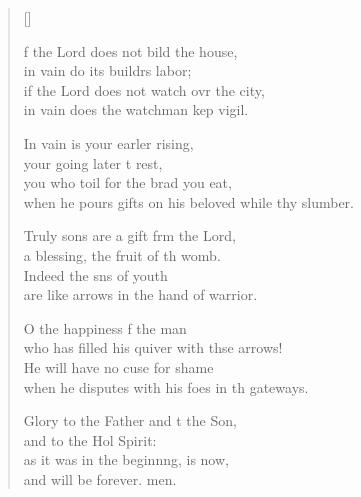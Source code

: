 \settowidth{\versewidth}{when he pours gifts on his beloved while they slumber.}
\begin{verse}[\versewidth]
  \begin{patverse}
f the Lord does not bild the house,\Med\\
in vain do its buildrs labor;\\
if the Lord does not watch ovr the city,\Med\\
in vain does the watchman kep vigil.

In vain is your earl\pointup{\i}er rising,\Med\\
your going later t rest,\\
you who toil for the brad you eat,\Med\\
when he pours gifts on his beloved while thy slumber.

Truly sons are a gift frm the Lord,\Med\\
a blessing, the fruit of th womb.\\
Indeed the sns of youth\Med\\
are like arrows in the hand of  warrior.

O the happiness f the man\Med\\
who has filled his quiver with thse arrows!\\
He will have no cuse for shame\Med\\
when he disputes with his foes in th gateways.

Glory to the Father and t the Son,\Med\\
and to the Hol Spirit:\\
as it was in the beginn\pointup{\i}ng, is now,\Med\\
and will be forever. men. 
  \end{patverse}
\end{verse}
